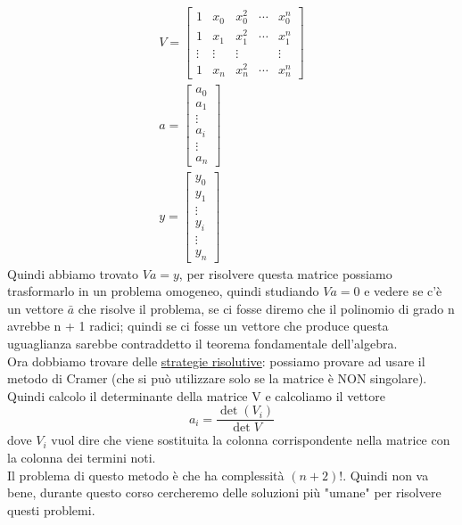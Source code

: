 \documentclass[a4paper, portrait]{book}
\numberwithin{equation}{chapter} %
\begin{document}
\begin{gather}
    V = \begin{bmatrix}
        1&x_0&x_0^2&\cdots&x_0^n\\
        1&x_1&x_1^2&\cdots&x_1^n\\
        \vdots&\vdots&\vdots&&\vdots\\
        1&x_n&x_n^2&\cdots&x_n^n
    \end{bmatrix}\\
    a = \begin{bmatrix}
        a_0\\
        a_1\\
        \vdots\\
        a_i\\
        \vdots\\
        a_n
    \end{bmatrix}\\
    y = \begin{bmatrix}
        y_0\\
        y_1\\
        \vdots\\
        y_i\\
        \vdots\\
        y_n
    \end{bmatrix}
\end{gather}
Quindi abbiamo trovato $Va =y$, per risolvere questa matrice possiamo trasformarlo in un problema omogeneo, quindi studiando $Va = 0$ e vedere se c'è un vettore $\bar{a}$ che risolve il problema, se ci fosse diremo che il polinomio di grado n avrebbe n + 1 radici; quindi se ci fosse un vettore che produce questa uguaglianza sarebbe contraddetto il teorema fondamentale dell'algebra.\\
Ora dobbiamo trovare delle \underline{strategie risolutive}: possiamo provare ad usare il metodo di Cramer (che si può utilizzare solo se la matrice è NON singolare). Quindi calcolo il determinante della matrice V e calcoliamo il vettore $$a_i = \frac{\det(V_i)}{\det {V}}$$ dove $V_i$ vuol dire che viene sostituita la colonna corrispondente nella matrice con la colonna dei termini noti.\\
Il problema di questo metodo è che ha complessità $(n+2)!$. Quindi non va bene, durante questo corso cercheremo delle soluzioni più "umane" per risolvere questi problemi.
\end{document}
